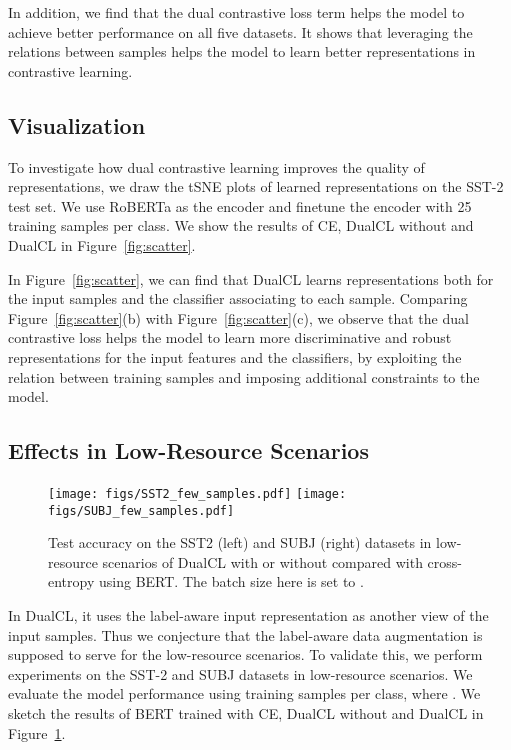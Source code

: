 In addition, we find that the dual contrastive loss term helps the model to achieve better performance on all five datasets. It shows that leveraging the relations between samples helps the model to learn better representations in contrastive learning.

\subsection{Visualization}

To investigate how dual contrastive learning improves the quality of representations, we draw the tSNE plots of learned representations on the SST-2 test set. We use RoBERTa as the encoder and finetune the encoder with 25 training samples per class. We show the results of CE, DualCL without  and DualCL in Figure~\ref{fig:scatter}.

In Figure~\ref{fig:scatter}, we can find that DualCL learns representations both for the input samples and the classifier associating to each sample. Comparing Figure~\ref{fig:scatter}(b) with Figure~\ref{fig:scatter}(c), we observe that the dual contrastive loss helps the model to learn more discriminative and robust representations for the input features and the classifiers, by exploiting the relation between training samples and imposing additional constraints to the model.

\subsection{Effects in Low-Resource Scenarios}

\begin{figure}[t]
    \centering
    \texttt{[image: figs/SST2\_few\_samples.pdf]}
    \texttt{[image: figs/SUBJ\_few\_samples.pdf]}
    \caption{Test accuracy on the SST2 (left) and SUBJ (right) datasets in low-resource scenarios of DualCL with or without  compared with cross-entropy using BERT. The batch size here is set to .}
    \label{fig:few_data}
\end{figure}

In DualCL, it uses the label-aware input representation as another view of the input samples. Thus we conjecture that the label-aware data augmentation is supposed to serve for the low-resource scenarios. To validate this, we perform experiments on the SST-2 and SUBJ datasets in low-resource scenarios. We evaluate the model performance using  training samples per class, where . We sketch the results of BERT trained with CE, DualCL without  and DualCL in Figure~\ref{fig:few_data}.

